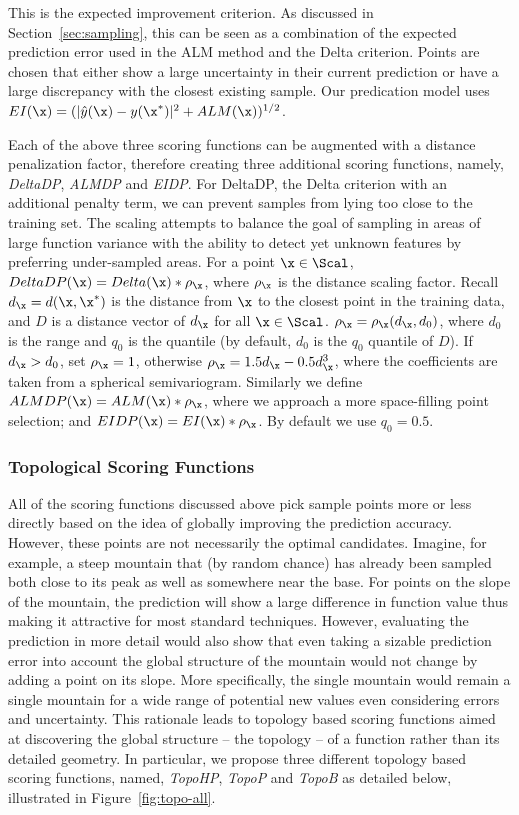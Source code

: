  This is the expected improvement criterion.
%
As discussed in Section~\ref{sec:sampling}, this can be seen as a combination of the expected prediction error used in the ALM method and the Delta criterion.
%
Points are chosen that either show a large uncertainty in their current prediction or have a large discrepancy with the closest existing sample.
%
Our predication model uses $EI(\x) = (|\hat{y}(\x) - y(\x^*)|^2+ ALM(\x))^{1/2}$.

 Each of the above three scoring functions can be augmented with a distance penalization factor, therefore creating three additional scoring functions, namely, \emph{DeltaDP}, \emph{ALMDP} and \emph{EIDP}.
%
For DeltaDP, the Delta criterion with an additional penalty term, we can prevent samples from lying too close to the training set.
%
The scaling attempts to balance the goal of sampling in areas of large function variance with the ability to detect yet unknown features by preferring under-sampled areas.
%
For a point $\x \in \Scal$, $DeltaDP(\x) = Delta(\x) * \rho_\x$, where $\rho_\x$ is the distance scaling factor.
%
Recall $d_\x = d(\x,\x^*)$ is the distance from $\x$ to the closest point in the training data, and $D$ is a distance vector of $d_\x$ for all $\x \in \Scal$.
%
$\rho_\x = \rho_\x (d_\x, d_0)$, where $d_0$ is the range and $q_0$ is the quantile (by default, $d_0$ is the $q_0$ quantile of $D$).
%
If $d_\x>d_0$, set $\rho_\x = 1$, otherwise $\rho_\x = 1.5d_\x-0.5d_\x^3$, where the coefficients are taken from a spherical semivariogram.
%
Similarly we define $ALMDP(\x) = ALM(\x) * \rho_\x$, where we approach a more space-filling point selection; and $EIDP(\x) = EI(\x) * \rho_\x$.  By default we use $q_0 = 0.5$.


\subsubsection{Topological Scoring Functions}
\label{sec:toposcoring}
All of the scoring functions discussed above pick sample points more or less directly based on the idea of globally improving the prediction accuracy.
%
However, these points are not necessarily the optimal candidates.
%
Imagine, for example, a steep mountain that (by random chance) has already been sampled both close to its peak as well as somewhere near the base.
%
For points on the slope of the mountain, the prediction will show a large difference in function value thus
making it attractive for most standard techniques.
%
However, evaluating the prediction in more detail would also show that even taking a sizable prediction error into account the global structure of the mountain would not change by adding a point on its slope.
%
More specifically, the single mountain would remain a single mountain for a wide range of potential new values even considering errors and uncertainty.
%
This rationale leads to topology based scoring functions aimed at discovering the global structure -- the topology -- of a function rather than its detailed geometry.
%
In particular, we propose three different topology based scoring functions, named, \emph{TopoHP}, \emph{TopoP} and \emph{TopoB} as detailed below, illustrated in Figure~\ref{fig:topo-all}.


